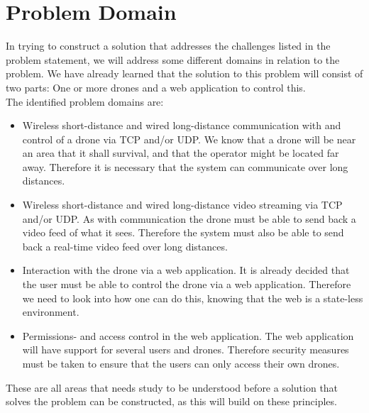 \section{Problem Domain}
In trying to construct a solution that addresses the challenges listed in the problem statement, we will address some different domains in relation to the problem. We have already learned that the solution to this problem will consist of two parts: One or more drones and a web application to control this. \\

The identified problem domains are:
\begin{itemize}
	\item Wireless short-distance and wired long-distance communication with and control of a drone via TCP and/or UDP. We know that a drone will be near an area that it shall survival, and that the operator might be located far away. Therefore it is necessary that the system can communicate over long distances. 
	\item Wireless short-distance and wired long-distance video streaming via TCP and/or UDP. As with communication the drone must be able to send back a video feed of what it sees. Therefore the system must also be able to send back a real-time video feed over long distances. 
	\item Interaction with the drone via a web application. It is already decided that the user must be able to control the drone via a web application. Therefore we need to look into how one can do this, knowing that the web is a state-less environment. 
	\item Permissions- and access control in the web application. The web application will have support for several users and drones. Therefore security measures must be taken to ensure that the users can only access their own drones.
\end{itemize}

These are all areas that needs study to be understood before a solution that solves the problem can be constructed, as this will build on these principles.
